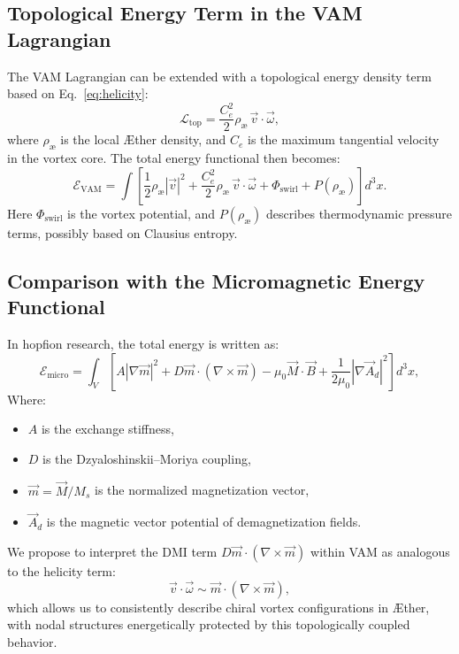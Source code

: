 \subsection{Topological Energy Term in the VAM Lagrangian}

The VAM Lagrangian can be extended with a topological energy density term based on Eq.~\eqref{eq:helicity}:
\begin{equation}
    \mathcal{L}_{\text{top}} = \frac{C_e^2}{2} \rho_\text{\ae} \, \vec{v} \cdot \vec{\omega},
\end{equation}
where $\rho_\text{\ae}$ is the local Æther density, and $C_e$ is the maximum tangential velocity in the vortex core. The total energy functional then becomes:
\begin{equation}
    \mathcal{E}_{\text{VAM}} = \int \left[
                                        \frac{1}{2} \rho_\text{\ae} |\vec{v}|^2
        + \frac{C_e^2}{2} \rho_\text{\ae} \, \vec{v} \cdot \vec{\omega}
                                        + \Phi_{\text{swirl}} + P(\rho_\text{\ae})
    \right] d^3x.
\end{equation}
Here $\Phi_{\text{swirl}}$ is the vortex potential, and $P(\rho_\text{\ae})$ describes thermodynamic pressure terms, possibly based on Clausius entropy.

\subsection{Comparison with the Micromagnetic Energy Functional}

In hopfion research, the total energy is written as:
\begin{equation}
    \mathcal{E}_{\text{micro}} = \int_V \left[
                                            A |\nabla \vec{m}|^2 + D \vec{m} \cdot (\nabla \times \vec{m}) - \mu_0 \vec{M} \cdot \vec{B} + \frac{1}{2\mu_0} |\nabla \vec{A}_d|^2
    \right] d^3x,
\end{equation}
Where:
\begin{itemize}
    \item $A$ is the exchange stiffness,
    \item $D$ is the Dzyaloshinskii–Moriya coupling,
    \item $\vec{m} = \vec{M}/M_s$ is the normalized magnetization vector,
    \item $\vec{A}_d$ is the magnetic vector potential of demagnetization fields.
\end{itemize}

We propose to interpret the DMI term $D \vec{m} \cdot (\nabla \times \vec{m})$ within VAM as analogous to the helicity term:
\begin{equation}
    \vec{v} \cdot \vec{\omega} \sim \vec{m} \cdot (\nabla \times \vec{m}),
\end{equation}
which allows us to consistently describe chiral vortex configurations in Æther, with nodal structures energetically protected by this topologically coupled behavior.

